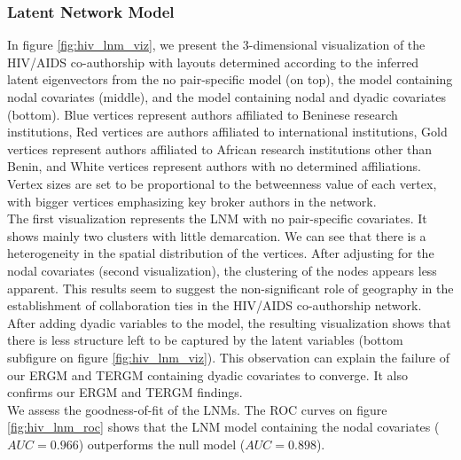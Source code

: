 \subsubsection{Latent Network Model}
\label{hiv_sec:results_lnm}
In figure \ref{fig:hiv_lnm_viz}, we present the 3-dimensional visualization of the HIV/AIDS co-authorship with layouts determined according to the inferred latent eigenvectors from the no pair-specific model (on top), the model containing nodal covariates (middle), and the model containing nodal and dyadic covariates (bottom). Blue vertices represent authors affiliated to Beninese research institutions, Red vertices are authors affiliated to international institutions, Gold vertices represent authors affiliated to African research institutions other than Benin, and White vertices represent authors with no determined affiliations. Vertex sizes are set to be proportional to the betweenness value of each vertex, with bigger vertices emphasizing key broker authors in the network. \\
The first visualization represents the LNM with no pair-specific covariates. It shows mainly two clusters with little demarcation. We can see that there is a heterogeneity in the spatial distribution of the vertices. After adjusting for the nodal covariates (second visualization), the clustering of the nodes appears less apparent. This results seem to suggest the non-significant role of geography in the establishment of collaboration ties in the HIV/AIDS co-authorship network. \\
After adding dyadic variables to the model, the resulting visualization shows that there is less structure left to be captured by the latent variables (bottom subfigure on figure \ref{fig:hiv_lnm_viz}). This observation can explain the failure of our ERGM and TERGM containing dyadic covariates to converge. It also confirms our ERGM and TERGM findings. \\
We assess the goodness-of-fit of the LNMs. The ROC curves on figure \ref{fig:hiv_lnm_roc} shows that the LNM model containing the nodal covariates ($AUC=0.966$) outperforms the null model ($AUC=0.898$).

